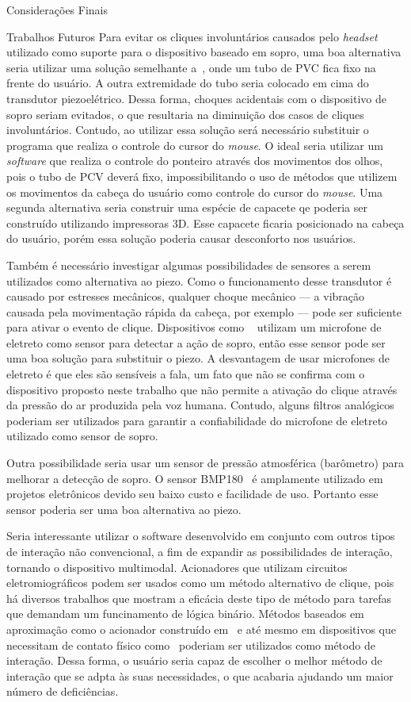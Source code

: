 \begin{chapter}{Considerações Finais}
\begin{section}{Trabalhos Futuros}
Para evitar os cliques involuntários causados pelo \textit{headset} utilizado
como suporte para o dispositivo baseado em sopro, uma boa alternativa seria
utilizar uma solução semelhante a~\cite{ok}, onde um tubo de PVC fica fixo na
frente do usuário. A outra extremidade do tubo seria colocado em cima do
transdutor piezoelétrico. Dessa forma, choques acidentais com o dispositivo de
sopro seriam evitados, o que resultaria na diminuição dos casos de cliques
involuntários. Contudo, ao utilizar essa solução será necessário substituir o
programa que realiza o controle do cursor do \textit{mouse}. O ideal seria
utilizar um \textit{software} que realiza o controle do ponteiro através dos
movimentos dos olhos, pois o tubo de PCV deverá fixo, impossibilitando o uso de
métodos que utilizem os movimentos da cabeça do usuário como controle do cursor
do \textit{mouse}. Uma segunda alternativa seria construir uma espécie de
capacete qe poderia ser construído utilizando impressoras 3D. Esse capacete
ficaria posicionado na cabeça do usuário, porém essa solução poderia causar
desconforto nos usuários.  

Também é necessário investigar algumas possibilidades de sensores a serem
utilizados como alternativa ao piezo. Como o funcionamento desse transdutor é
causado por estresses mecânicos, qualquer choque mecânico --- a vibração causada
pela movimentação rápida da cabeça, por exemplo --- pode ser suficiente para
ativar o evento de clique. Dispositivos como ~\cite{ok} utilizam  um microfone
de eletreto como sensor para detectar a ação de sopro, então esse sensor pode
ser uma boa solução para substituir o piezo. A desvantagem de usar microfones de
eletreto é que eles são sensíveis a fala, um fato que não se confirma com o
dispositivo proposto neste trabalho que não permite a ativação do clique através
da pressão do ar produzida pela voz humana. Contudo, alguns filtros analógicos
poderiam ser utilizados para garantir a confiabilidade do microfone de eletreto
utilizado como sensor de sopro. 

Outra possibilidade seria usar um sensor de pressão atmosférica (barômetro) para
melhorar a detecção de sopro. O sensor BMP180~\cite{bmp180} é amplamente
utilizado em projetos eletrônicos devido seu baixo custo e facilidade de uso.
Portanto esse sensor poderia ser uma boa alternativa ao piezo.

Seria interessante utilizar o software desenvolvido em conjunto com outros tipos
de interação não convencional, a fim de expandir as possibilidades de interação,
tornando o dispositivo multimodal. Acionadores  que utilizam circuitos
eletromiográficos podem ser usados como um método alternativo de clique, pois
há diversos trabalhos que mostram a eficácia deste tipo de método para tarefas
que demandam um funcinamento de lógica binário. Métodos baseados em aproximação
como o acionador construído em~\cite{Batista17} e até mesmo em dispositivos
que necessitam de contato físico como~\cite{ok} poderiam ser utilizados como
método de interação. Dessa forma, o usuário seria capaz de escolher o melhor
método de interação que se adpta às suas necessidades, o que acabaria ajudando
um maior número de deficiências.


\end{section}
\end{chapter}

